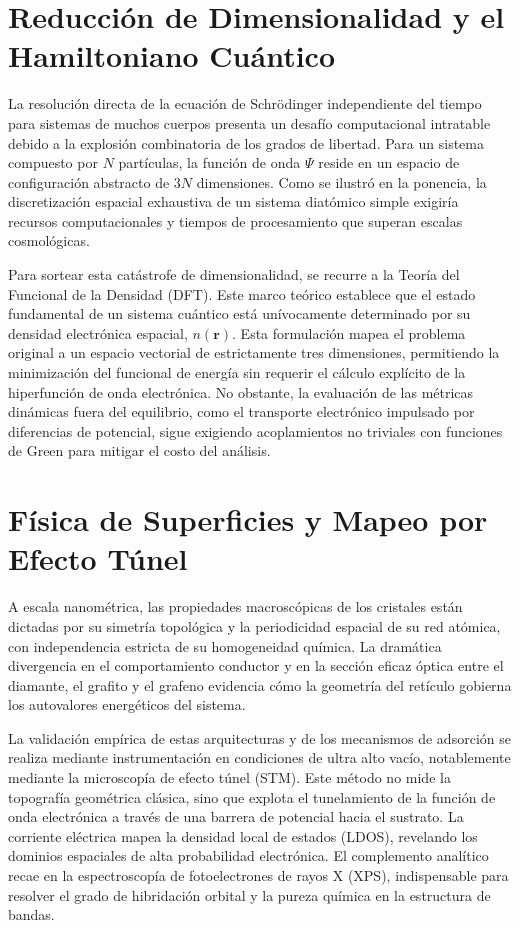 \section{Reducción de Dimensionalidad y el Hamiltoniano Cuántico}
\label{sec:reduccion}

La resolución directa de la ecuación de Schrödinger independiente del tiempo
para sistemas de muchos cuerpos presenta un desafío computacional intratable
debido a la explosión combinatoria de los grados de libertad.  Para un sistema
compuesto por $N$ partículas, la función de onda $\Psi$ reside en un espacio de
configuración abstracto de $3N$ dimensiones. Como se ilustró en la ponencia, la
discretización espacial exhaustiva de un sistema diatómico simple exigiría
recursos computacionales y tiempos de procesamiento que superan escalas
cosmológicas.

Para sortear esta catástrofe de dimensionalidad, se recurre a la Teoría del
Funcional de la Densidad (DFT). Este marco teórico establece que el estado
fundamental de un sistema cuántico está unívocamente determinado por su densidad
electrónica espacial, $n(\mathbf{r})$. Esta formulación mapea el problema
original a un espacio vectorial de estrictamente tres dimensiones, permitiendo
la minimización del funcional de energía sin requerir el cálculo explícito de la
hiperfunción de onda electrónica. No obstante, la evaluación de las métricas
dinámicas fuera del equilibrio, como el transporte electrónico impulsado por
diferencias de potencial, sigue exigiendo acoplamientos no triviales con
funciones de Green para mitigar el costo del análisis.

\section{Física de Superficies y Mapeo por Efecto Túnel}
\label{sec:superficies}

A escala nanométrica, las propiedades macroscópicas de los cristales están
dictadas por su simetría topológica y la periodicidad espacial de su red
atómica, con independencia estricta de su homogeneidad química. La dramática
divergencia en el comportamiento conductor y en la sección eficaz óptica entre
el diamante, el grafito y el grafeno evidencia cómo la geometría del retículo
gobierna los autovalores energéticos del sistema.

La validación empírica de estas arquitecturas y de los mecanismos de adsorción
se realiza mediante instrumentación en condiciones de ultra alto vacío,
notablemente mediante la microscopía de efecto túnel (STM). Este método no mide
la topografía geométrica clásica, sino que explota el tunelamiento de la función
de onda electrónica a través de una barrera de potencial hacia el sustrato. La
corriente eléctrica mapea la densidad local de estados (LDOS), revelando los
dominios espaciales de alta probabilidad electrónica. El complemento analítico
recae en la espectroscopía de fotoelectrones de rayos X (XPS), indispensable
para resolver el grado de hibridación orbital y la pureza química en la
estructura de bandas.

